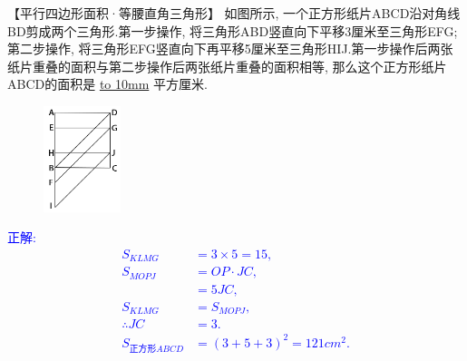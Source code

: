 \item {
    【平行四边形面积·等腰直角三角形】
    {如图所示, 一个正方形纸片ABCD沿对角线BD剪成两个三角形.第一步操作, 将三角形ABD竖直向下平移3厘米至三角形EFG;第二步操作, 将三角形EFG竖直向下再平移5厘米至三角形HIJ.第一步操作后两张纸片重叠的面积与第二步操作后两张纸片重叠的面积相等, 那么这个正方形纸片ABCD的面积是 \underline{\hbox to 10mm{}} 平方厘米.} 
    \begin{figure}[H] 
        \centering
        \includegraphics[width=0.2\textwidth]{./pics/Chapter_2/10.png}
    \end{figure}
    \ifshowSolution 
        \fangsong{}\textcolor{blue}{
            正解: \\
            \begin{align*}
                S_{KLMG} &= 3\times 5 = 15, \\
                S_{MOPJ} &= OP\cdot JC, \\
                &= 5JC, \\
                S_{KLMG} &= S_{MOPJ},\\
                \therefore JC &= 3.\\
                S_{正方形ABCD} &= (3+5+3)^2 = 121 {cm}^2.\\
            \end{align*}
        }
    \else
        \vspace{1cm}
    \fi
}

